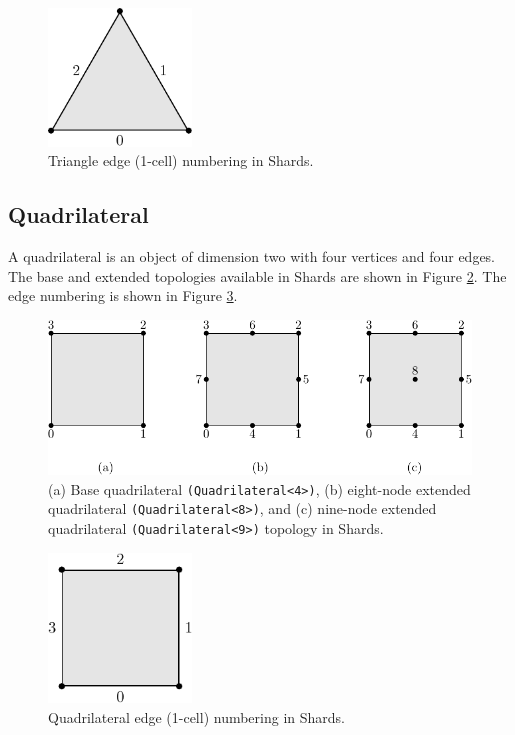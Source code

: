 \documentclass[pdf,12pt,relaxed]{SANDreport}
\begin{document}
\begin{figure}[ht]
  \begin{center}
     \includegraphics[width=1.5in]{topo_figs/tri_edge.pdf}%
  \end{center}
 \caption{Triangle edge (1-cell) numbering in Shards.}
\label{fig:tri2}
\end{figure}


\subsection{Quadrilateral}
A quadrilateral is an object of dimension two with four vertices and four edges. The base and extended topologies available in Shards are shown in Figure \ref{fig:quad1}. The edge numbering is shown in Figure \ref{fig:quad2}.
\begin{figure}[ht]
 \begin{center}
    \includegraphics[width=5.5in]{topo_figs/quad_node.pdf}%
 \end{center}
 \caption{(a) Base quadrilateral {\tt (Quadrilateral<4>)}, (b) eight-node extended quadrilateral {\tt (Quadrilateral<8>)}, and (c) nine-node extended quadrilateral {\tt (Quadrilateral<9>)} topology in Shards.}
\label{fig:quad1}
\end{figure}

\begin{figure}[ht]
 \begin{center}
    \includegraphics[width=1.5in]{topo_figs/quad_edge.pdf}
 \end{center}
 \caption{Quadrilateral edge (1-cell) numbering in Shards.}
\label{fig:quad2}
\end{figure}
\end{document}
